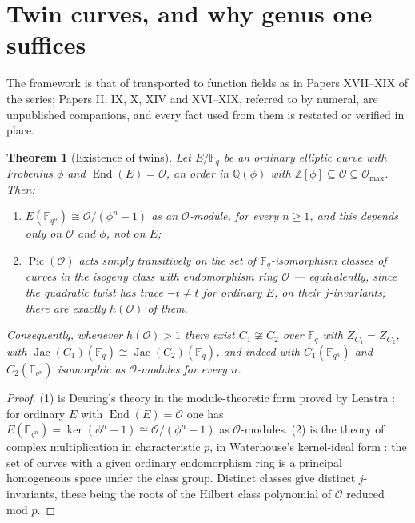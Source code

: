 \documentclass[11pt]{amsart}
\numberwithin{equation}{section}
\newtheorem{theorem}{Theorem}[section]
\theoremstyle{definition}
\theoremstyle{remark}
\newcommand{\Z}{\mathbb{Z}}
\newcommand{\Q}{\mathbb{Q}}
\newcommand{\F}{\mathbb{F}}
\newcommand{\cO}{\mathcal{O}}
\newcommand{\Pic}{\operatorname{Pic}}
\newcommand{\Jac}{\operatorname{Jac}}
\newcommand{\End}{\operatorname{End}}
\begin{document}
\maketitle

\section{Twin curves, and why genus one suffices}

The framework is that of \cite{Main} transported to function fields as in Papers XVII--XIX
of the series; Papers II, IX, X, XIV and XVI--XIX, referred to by numeral, are unpublished
companions, and every fact used from them is restated or verified in place.

\begin{theorem}[Existence of twins]\label{thm:twins}
Let $E/\F_q$ be an ordinary elliptic curve with Frobenius $\phi$ and $\End(E)=\cO$, an order
in $\Q(\phi)$ with $\Z[\phi]\subseteq\cO\subseteq\cO_{\max}$. Then:
\begin{enumerate}
\item $E(\F_{q^n})\cong\cO/(\phi^n-1)$ as an $\cO$-module, for every $n\ge1$, and this
depends only on $\cO$ and $\phi$, not on $E$;
\item $\Pic(\cO)$ acts simply transitively on the set of $\F_q$-isomorphism classes of
curves in the isogeny class with endomorphism ring $\cO$ --- equivalently, since the
quadratic twist has trace $-t\ne t$ for ordinary $E$, on their $j$-invariants; there are
exactly $h(\cO)$ of them.
\end{enumerate}
Consequently, whenever $h(\cO)>1$ there exist $C_1\not\cong C_2$ over $\F_q$ with
$Z_{C_1}=Z_{C_2}$, with $\Jac(C_1)(\F_q)\cong\Jac(C_2)(\F_q)$, and indeed with
$C_1(\F_{q^n})$ and $C_2(\F_{q^n})$ isomorphic as $\cO$-modules for every $n$.
\end{theorem}

\begin{proof}
(1) is Deuring's theory \cite{Deuring} in the module-theoretic form proved by Lenstra
\cite{Lenstra}: for ordinary $E$ with $\End(E)=\cO$ one has
$E(\F_{q^n})=\ker(\phi^n-1)\cong\cO/(\phi^n-1)$ as $\cO$-modules. (2) is the theory of
complex multiplication in characteristic $p$, in Waterhouse's kernel-ideal form
\cite{Waterhouse}: the set of curves with a given ordinary endomorphism ring is a principal
homogeneous space under the class group. Distinct classes give distinct $j$-invariants, these
being the roots of the Hilbert class polynomial of $\cO$ reduced mod $p$.
\end{proof}
\end{document}
